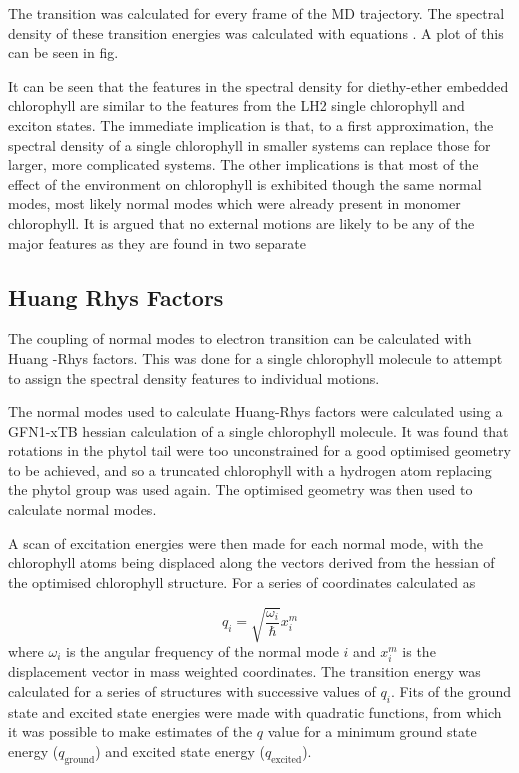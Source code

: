 The \Qy transition was calculated for every frame of the MD trajectory. The spectral
density of these transition energies was calculated with equations . A plot of this 
can be seen in fig.

It can be seen that the features in the spectral density for diethy-ether embedded
chlorophyll are similar to the features from the LH2 single chlorophyll and exciton
states. The immediate implication is that, to a first approximation, the spectral
density of a single chlorophyll in smaller systems can replace those for larger,
more complicated systems. The other implications is that most of the effect of 
the environment on chlorophyll is exhibited though the same normal modes, most likely
normal modes which were already present in monomer chlorophyll. It is argued that
no external motions are likely to be any of the major features as they are found
in two separate 

\subsection{Huang Rhys Factors}
\label{subsec:hrf}

The coupling of normal modes to electron transition can be calculated with Huang
-Rhys factors. This was done for a single chlorophyll molecule to attempt to assign
the spectral density features to individual motions.

The normal modes used to calculate Huang-Rhys factors were calculated using a GFN1-xTB
hessian calculation of a single chlorophyll molecule. It was found that rotations
in the phytol tail were too unconstrained for a good optimised geometry to be achieved, 
and so a truncated chlorophyll with a hydrogen atom replacing the phytol group was
used again. The optimised geometry was then used to calculate normal modes.

A scan of excitation energies were then made for each normal mode, with the chlorophyll
atoms being displaced along the vectors derived from the hessian of the optimised
chlorophyll structure. For a series of coordinates calculated as 

\begin{equation}
    q_i = \sqrt{\frac{\omega_i}{\hbar}} x^m_i
\end{equation}
%
where $\omega_i$ is the angular frequency of the normal mode $i$ and $x^m_i$ is
the displacement vector in mass weighted coordinates. The \Qy transition energy 
was calculated for a series of structures with successive values of $q_i$. Fits 
of the ground state and excited state energies were made with quadratic functions,
from which it was possible to make estimates of the $q$ value for a minimum ground
state energy ($q_{\text{ground}}$) and excited state energy ($q_{\text{excited}}$).

